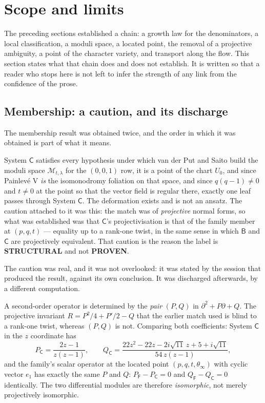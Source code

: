\section{Scope and limits}\label{sec:limits}

The preceding sections established a chain: a growth law for the denominators,
a local classification, a moduli space, a located point, the removal of a
projective ambiguity, a point of the character variety, and transport along the
flow. This section states what that chain does and does not establish. It is
written so that a reader who stops here is not left to infer the strength of
any link from the confidence of the prose.

\subsection{Membership: a caution, and its discharge}\label{ssec:verdict}

The membership result was obtained twice, and the order in which it was
obtained is part of what it means.

\begin{remark}
System $\mathsf C$ satisfies every hypothesis under which van der Put and Saito
build the moduli space $\mathcal M_{t,\lambda}$ for the $(0,0,1)$ row, it is a point of the
chart $U_0$, and since Painlev\'e V \emph{is} the isomonodromy foliation on
that space, and since $q(q-1)\neq0$ and $t\neq0$ at the point so that the
vector field is regular there, exactly one leaf passes through System
$\mathsf C$. The deformation exists and is not an ansatz. The caution attached
to it was this: the match was of \emph{projective} normal forms, so what was
established was that $\mathsf C$'s projectivisation is that of the family
member at $(p,q,t)$ --- equality up to a rank-one twist, in the same sense in
which $\mathsf B$ and $\mathsf C$ are projectively equivalent. That caution is
the reason the label is \textbf{STRUCTURAL} and not \textbf{PROVEN}.
\end{remark}

The caution was real, and it was not overlooked: it was stated by the session
that produced the result, against its own conclusion. It was discharged
afterwards, by a different computation.

\begin{remark}
A second-order operator is determined by the \emph{pair} $(P,Q)$ in
$\partial^2+P\partial+Q$. The projective invariant
$R=P^2/4+P'/2-Q$ that the earlier match used is blind to a rank-one twist,
whereas $(P,Q)$ is not. Comparing both coefficients: System $\mathsf C$ in the
$z$ coordinate has
\[
  P_{\mathsf C}=\frac{2z-1}{z(z-1)},\qquad
  Q_{\mathsf C}=\frac{22z^{2}-22z-2i\sqrt{11}\,z+5+i\sqrt{11}}{54\,z(z-1)},
\]
and the family's scalar operator at the located point $(p,q,t,\theta_\infty)$
with cyclic vector $e_1$ has exactly the same $P$ and $Q$:
$P_{\mathsf F}-P_{\mathsf C}=0$ and $Q_{\mathsf F}-Q_{\mathsf C}=0$
identically. The two differential modules are therefore \emph{isomorphic}, not
merely projectively isomorphic.
\end{remark}

